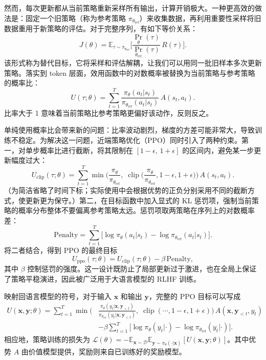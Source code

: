 然而，每次更新都从当前策略重新采样所有输出，计算开销极大。一种更高效的做法是：固定一个旧策略（称为参考策略 $\pi_{\theta_{\mathrm{ref}}}$）来收集数据，再利用重要性采样将旧数据重用于新策略的评估。对于完整序列，有如下等价关系：
\begin{equation}
J(\theta) = \mathbb{E}_{\tau\sim\pi_{\theta_{\mathrm{ref}}}}\Big[\frac{\Pr_{\theta}(\tau)}{\Pr_{\theta_{\mathrm{ref}}}(\tau)}\,R(\tau)\Big].
\end{equation}
该形式称为替代目标，它将采样和评估解耦，让我们可以用同一批旧样本多次更新策略。落实到 token 层面，效用函数中的对数概率被替换为当前策略与参考策略的概率比：
\begin{equation}
U(\tau;\theta) = \sum_{t=1}^{T} \frac{\pi_{\theta}(a_t|s_t)}{\pi_{\theta_{\mathrm{ref}}}(a_t|s_t)}\,A(s_t,a_t).
\end{equation}
比率大于 1 意味着当前策略比参考策略更偏好该动作，反则反之。

单纯使用概率比会带来新的问题：比率波动剧烈，梯度的方差可能非常大，导致训练不稳定。为解决这一问题，近端策略优化（PPO）同时引入了两种约束。第一，对单步概率比进行截断，将其限制在 $[1-\epsilon,\,1+\epsilon]$ 的区间内，避免某一步更新幅度过大：
\begin{equation}
U_{\mathrm{clip}}(\tau;\theta) = \sum_{t=1}^{T} \min\Big(\frac{\pi_{\theta}}{\pi_{\theta_{\mathrm{ref}}}},\;
\operatorname{clip}\big(\frac{\pi_{\theta}}{\pi_{\theta_{\mathrm{ref}}}}, 1-\epsilon, 1+\epsilon\big)\Big)\,A(s_t,a_t).
\end{equation}
（为简洁省略了时间下标；实际使用中会根据优势的正负分别采用不同的截断方式，使更新更为保守。）第二，在目标函数中加入显式的 KL 惩罚项，强制当前策略的概率分布整体不要偏离参考策略太远。惩罚项取两策略在序列上的对数概率差：
\begin{equation}
\mathrm{Penalty} = \sum_{t=1}^{T}\Big[\log \pi_{\theta}(a_t|s_t) - \log \pi_{\theta_{\mathrm{ref}}}(a_t|s_t)\Big].
\end{equation}
将二者结合，得到 PPO 的最终目标
\begin{equation}
U_{\mathrm{ppo}}(\tau;\theta) = U_{\mathrm{clip}}(\tau;\theta) - \beta\,\mathrm{Penalty},
\label{eq:ppo-objective}
\end{equation}
其中 $\beta$ 控制惩罚的强度。这一设计既防止了局部更新过于激进，也在全局上保证了策略平稳演进，因此被广泛用于大语言模型的 RLHF 训练。

映射回语言模型的符号，对于输入 $\mathbf{x}$ 和输出 $\mathbf{y}$，完整的 PPO 目标可以写成
\begin{align}
U(\mathbf{x},\mathbf{y};\theta) = \sum_{t=1}^{T} \min\Big(&\frac{\pi_{\theta}(y_t|\mathbf{x},\mathbf{y}_{<t})}{\pi_{\theta_{\mathrm{ref}}}(y_t|\mathbf{x},\mathbf{y}_{<t})},\;
\operatorname{clip}(\cdots, 1-\epsilon, 1+\epsilon)\Big)\,A(\mathbf{x},\mathbf{y}_{<t},y_t) \nonumber \\
&- \beta\sum_{t=1}^{T}\bigl[\log \pi_{\theta}(y_t|\cdot) - \log \pi_{\theta_{\mathrm{ref}}}(y_t|\cdot)\bigr].
\end{align}
相应地，策略训练的损失为 $\mathcal{L}(\theta) = -\mathbb{E}_{\mathbf{x}\sim\mathcal{D}}\mathbb{E}_{\mathbf{y}\sim\pi_{\theta}(\cdot|\mathbf{x})}[U(\mathbf{x},\mathbf{y};\theta)]$。其中优势 $A$ 由价值模型提供，奖励则来自已训练好的奖励模型。

